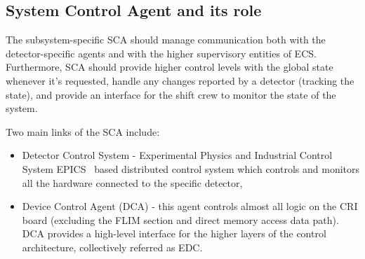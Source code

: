 \subsection{System Control Agent and its role}
The subsystem-specific \gls{SCA} should manage communication both with the detector-specific agents and with the higher supervisory entities of \gls{ECS}. Furthermore, \gls{SCA} should provide higher control levels with the global state whenever it's requested, handle any changes reported by a detector (tracking the state), and provide an interface for the shift crew to monitor the state of the system. 

Two main links of the \gls{SCA} include:
\begin{itemize}
    \item Detector Control System - Experimental Physics and Industrial Control System \gls{EPICS}~\cite{EPICS} based distributed control system which controls and monitors all the hardware connected to the specific detector,
    \item Device Control Agent (\gls{DCA}) - this agent controls almost all logic on the \gls{CRI} board (excluding the \gls{FLIM} section and direct memory access data path). \gls{DCA} provides a high-level interface for the higher layers of the control architecture, collectively referred as \gls{EDC}. 
\end{itemize}










